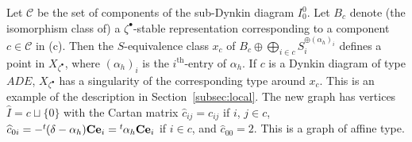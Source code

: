 \documentclass[pdftex]{sigma}
\theoremstyle{definition}
\numberwithin{equation}{section}
\newcommand{\subsecref}[1]{Section~\ref{#1}}
\newcommand{\lsp}[2]{{\mskip-.3mu}{}^{#1}\mskip-1mu{#2}}
\newcommand{\bC}{{\mathbf C}} %
\newcommand{\be}{{\mathbf e}}
\begin{document}
Let $\mathcal C$ be the set of components of the sub-Dynkin diagram
$I_0^0$. Let $B_c$ denote (the isomorphism class of) a
$\zeta^\bullet$-stable representation corresponding to a component
$c\in \mathcal C$ in (c). Then the $S$-equivalence class $x_c$ of
\(
   B_c\oplus \bigoplus_{i\in c} S_i^{\oplus (\alpha_h)_i}
\)
def\/ines a point in $X_{\zeta^\bullet}$, where $(\alpha_h)_i$ is the
$i^{\mathrm{th}}$-entry of $\alpha_h$. If $c$ is a Dynkin diagram of
type $ADE$, $X_{\zeta^\bullet}$ has a singularity of the corresponding type
around $x_c$. This is an example of the description in
\subsecref{subsec:local}. The new graph has vertices
$\widehat I = c\sqcup\{ 0\}$ with the Cartan matrix
\(
   \widehat{c}_{ij} = c_{ij}
\)
if $i$, $j\in c$,
\(
   \widehat{c}_{0i} = - \lsp{t}{(\delta - \alpha_h)}\bC \be_i
   = \lsp{t}{\alpha_h} \bC \be_i
\)
if $i\in c$,
and
$\widehat{c}_{00} = 2$. This is a graph of af\/f\/ine type.
\end{document}
